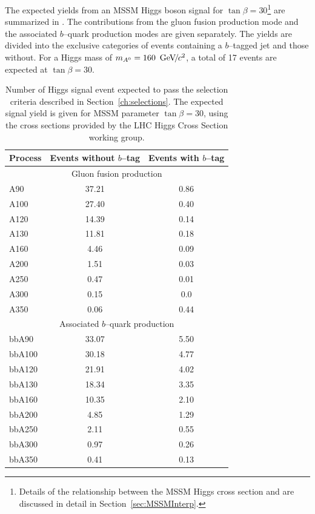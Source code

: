 The expected yields from an MSSM Higgs boson signal for \mbox{$\tan\beta =
30$}\footnote{Details of the relationship between the MSSM Higgs cross section
and \tb are discussed in detail in Section~\ref{sec:MSSMInterp}.}
are summarized in \label{tab:SignalExpResultsLooseAHtoMuTau}.  The contributions
from the gluon fusion production mode and the associated $b$--quark production
modes are given separately.  The yields are divided into the exclusive
categories of events containing a $b$--tagged jet and those without.  For a
Higgs mass of $m_{A^0} = 160~{\,\text{Ge\hspace{-.08em}V\hspace{-0.16em}/\hspace{-0.08em}}c^\text{2}}$, a total of 17 events are expected at
$\tan\beta = 30$.
%
\begin{table}[t]
\begin{center}
\begin{tabular}{|l|c|c|}
\hline
Process & Events without $b$--tag & Events with $b$--tag \\
\hline
\hline
\multicolumn{3}{|c|}{Gluon fusion production} \\
\hline
A90 & 37.21 & 0.86 \\
A100 & 27.40 & 0.40 \\
A120 & 14.39 & 0.14 \\
A130 & 11.81 & 0.18 \\
A160 & 4.46 & 0.09 \\
A200 & 1.51 & 0.03 \\
A250 & 0.47 & 0.01 \\
A300 & 0.15 & 0.0 \\
A350 & 0.06 & 0.44 \\
\hline
\multicolumn{3}{|c|}{Associated $b$--quark production} \\
\hline
bbA90 & 33.07 &  5.50 \\
bbA100 & 30.18 &  4.77 \\
bbA120 & 21.91 & 4.02 \\
bbA130 & 18.34 & 3.35 \\ 
bbA160 & 10.35 &  2.10 \\
bbA200 & 4.85  &  1.29 \\
bbA250 & 2.11 &  0.55 \\
bbA300 & 0.97 &  0.26 \\
bbA350 & 0.41 & 0.13 \\
\hline
\end{tabular}
\caption[Expected signal yields at \mbox{$\tan \beta = 30$}]{Number of Higgs
signal event expected to pass the selection criteria described in
Section~\ref{ch:selections}.  The expected signal yield is given for MSSM
parameter \mbox{$\tan \beta = 30$}, using the cross sections provided by the LHC
Higgs Cross Section working group.} \label{tab:SignalExpResultsLooseAHtoMuTau}
\end{center}
\end{table}

